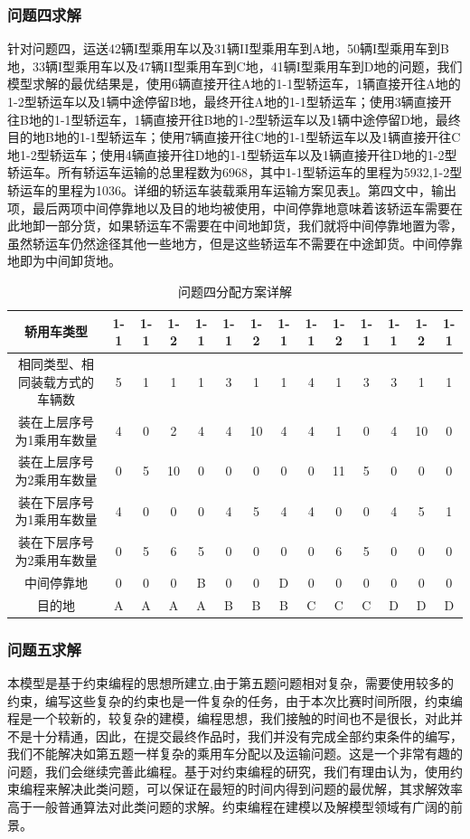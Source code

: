 \documentclass[UTF8，12pt]{ctexart}
\begin{document}
\subsubsection{问题四求解}
针对问题四，运送42辆I型乘用车以及31辆II型乘用车到A地，50辆I型乘用车到B地，33辆I型乘用车以及47辆II型乘用车到C地，41辆I型乘用车到D地的问题，我们模型求解的最优结果是，使用6辆直接开往A地的1-1型轿运车，1辆直接开往A地的1-2型轿运车以及1辆中途停留B地，最终开往A地的1-1型轿运车；使用3辆直接开往B地的1-1型轿运车，1辆直接开往B地的1-2型轿运车以及1辆中途停留D地，最终目的地B地的1-1型轿运车；使用7辆直接开往C地的1-1型轿运车以及1辆直接开往C地1-2型轿运车；使用4辆直接开往D地的1-1型轿运车以及1辆直接开往D地的1-2型轿运车。所有轿运车运输的总里程数为6968，其中1-1型轿运车的里程为5932,1-2型轿运车的里程为1036。详细的轿运车装载乘用车运输方案见表\ref{tab:answer4}。第四文中，输出项，最后两项中间停靠地以及目的地均被使用，中间停靠地意味着该轿运车需要在此地卸一部分货，如果轿运车不需要在中间地卸货，我们就将中间停靠地置为零，虽然轿运车仍然途径其他一些地方，但是这些轿运车不需要在中途卸货。中间停靠地即为中间卸货地。
\begin{table}[h!]
\centering
\caption{问题四分配方案详解}\label{tab:answer4}
\begin{tabular}{|c|c|c|c|c|c|c|c|c|c|c|c|c|c|}
\hline
轿用车类型 & 1-1 & 1-1 & 1-2 & 1-1 & 1-1 & 1-2 & 1-1 & 1-1 & 1-2 & 1-1 & 1-1 & 1-2 & 1-1\\ \hline 
相同类型、相同装载方式的车辆数 & 5 & 1 & 1 & 1 & 3 & 1 & 1 & 4 & 1 & 3 & 3 & 1 & 1\\ \hline 
装在上层序号为1乘用车数量 & 4 & 0 & 2 & 4 & 4 & 10 & 4 & 4 & 1 & 0 & 4 & 10 & 0\\ \hline 
装在上层序号为2乘用车数量 & 0 & 5 & 10 & 0 & 0 & 0 & 0 & 0 & 11 & 5 & 0 & 0 & 0\\ \hline 
装在下层序号为1乘用车数量 & 4 & 0 & 0 & 0 & 4 & 5 & 4 & 4 & 0 & 0 & 4 & 5 & 1\\ \hline 
装在下层序号为2乘用车数量 & 0 & 5 & 6 & 5 & 0 & 0 & 0 & 0 & 6 & 5 & 0 & 0 & 0\\ \hline 
中间停靠地 & 0 & 0 & 0 & B & 0 & 0 & D & 0 & 0 & 0 & 0 & 0 & 0\\ \hline 
目的地 & A & A & A & A & B & B & B & C & C & C & D & D & D\\ \hline 
\end{tabular}
\end{table}


\subsubsection{问题五求解}
本模型是基于约束编程的思想所建立,由于第五题问题相对复杂，需要使用较多的约束，编写这些复杂的约束也是一件复杂的任务，由于本次比赛时间所限，约束编程是一个较新的，较复杂的建模，编程思想，我们接触的时间也不是很长，对此并不是十分精通，因此，在提交最终作品时，我们并没有完成全部约束条件的编写，我们不能解决如第五题一样复杂的乘用车分配以及运输问题。这是一个非常有趣的问题，我们会继续完善此编程。基于对约束编程的研究，我们有理由认为，使用约束编程来解决此类问题，可以保证在最短的时间内得到问题的最优解，其求解效率高于一般普通算法对此类问题的求解。约束编程在建模以及解模型领域有广阔的前景。
\end{document}
